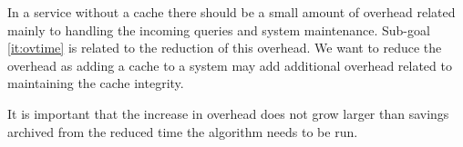 In a \spath service without a cache there should be a small amount of overhead related mainly to handling the incoming queries and system maintenance. Sub-goal \ref{it:ovtime} is related to the reduction of this overhead. We want to reduce the overhead as adding a cache to a \spath system may add additional overhead related to maintaining the cache integrity.

It is important that the increase in overhead does not grow larger than savings archived from the reduced time the \spath algorithm needs to be run.



% 
% 
% 
% 
% 
% 
